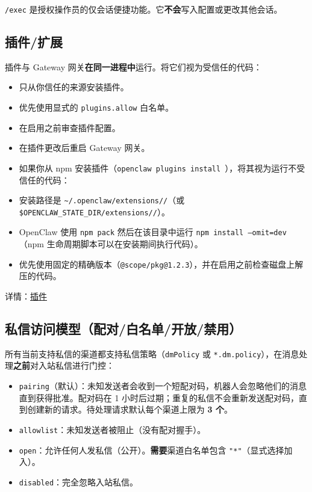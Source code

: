 \texttt{/exec} 是授权操作员的仅会话便捷功能。它\textbf{不会}写入配置或更改其他会话。

\subsection{插件/扩展}


插件与 Gateway 网关\textbf{在同一进程中}运行。将它们视为受信任的代码：

\begin{itemize}
  \item 只从你信任的来源安装插件。
  \item 优先使用显式的 \texttt{plugins.allow} 白名单。
  \item 在启用之前审查插件配置。
  \item 在插件更改后重启 Gateway 网关。
  \item 如果你从 npm 安装插件（\texttt{openclaw plugins install }），将其视为运行不受信任的代码：
  \item 安装路径是 \texttt{\textasciitilde{}/.openclaw/extensions//}（或 \texttt{\$OPENCLAW\_STATE\_DIR/extensions//}）。
  \item OpenClaw 使用 \texttt{npm pack} 然后在该目录中运行 \texttt{npm install --omit=dev}（npm 生命周期脚本可以在安装期间执行代码）。
  \item 优先使用固定的精确版本（\texttt{@scope/pkg@1.2.3}），并在启用之前检查磁盘上解压的代码。
\end{itemize}


详情：\href{/tools/plugin}{插件}

\subsection{私信访问模型（配对/白名单/开放/禁用）}


所有当前支持私信的渠道都支持私信策略（\texttt{dmPolicy} 或 \texttt{*.dm.policy}），在消息处理\textbf{之前}对入站私信进行门控：

\begin{itemize}
  \item \texttt{pairing}（默认）：未知发送者会收到一个短配对码，机器人会忽略他们的消息直到获得批准。配对码在 1 小时后过期；重复的私信不会重新发送配对码，直到创建新的请求。待处理请求默认每个渠道上限为 \textbf{3 个}。
  \item \texttt{allowlist}：未知发送者被阻止（没有配对握手）。
  \item \texttt{open}：允许任何人发私信（公开）。\textbf{需要}渠道白名单包含 \texttt{"*"}（显式选择加入）。
  \item \texttt{disabled}：完全忽略入站私信。
\end{itemize}


